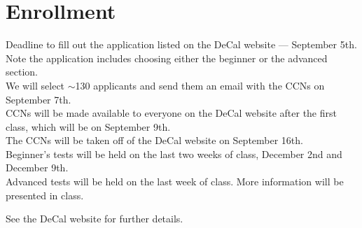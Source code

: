\documentclass[11pt]{article}
\begin{document}
\section*{Enrollment}
Deadline to fill out the application listed on the DeCal website — September 5th.\\
Note the application includes choosing either the beginner or the advanced section.\\
We will select $\sim$130 applicants and send them an email with the CCNs on September 7th.\\
CCNs will be made available to everyone on the DeCal website after the first class, which will be on September 9th.\\
The CCNs will be taken off of the DeCal website on September 16th.\\
Beginner’s tests will be held on the last two weeks of class, December 2nd and December 9th.\\
Advanced tests will be held on the last week of class. More information will be presented in class.

See the DeCal website for further details.
\end{document}

